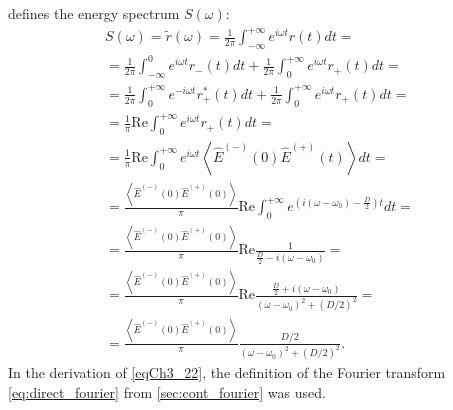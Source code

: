 defines the energy spectrum $S\left(\omega\right)$:  
\begin{eqnarray}
S\left(\omega\right) = \tilde{r}\left(\omega\right) = 
\frac{1}{2\pi}
\int_{-\infty}^{+\infty}e^{i \omega t} r\left(t\right) dt =
\nonumber \\
=
\frac{1}{2\pi}
\int_{-\infty}^0e^{i \omega t} r_{-}\left(t\right) dt +
\frac{1}{2\pi}
\int_0^{+\infty}e^{i \omega t} r_{+}\left(t\right) dt = 
\nonumber \\
=
\frac{1}{2\pi}
\int_0^{+\infty}e^{- i \omega t} r_{+}^{*}\left(t\right) dt +
\frac{1}{2\pi}
\int_0^{+\infty}e^{i \omega t} r_{+}\left(t\right) dt = 
\nonumber \\
=
\frac{1}{\pi} \mathrm{Re}
\int_0^{+\infty}e^{i \omega t} r_{+}\left(t\right) dt = 
\nonumber \\
= \frac{1}{\pi}\mathrm{Re}
\int_0^{+\infty}e^{i \omega t}
\left<\hat{E}^{(-)}\left(0\right)\hat{E}^{(+)}\left(t\right)\right> dt
=
\nonumber \\
= \frac{\left<\hat{E}^{(-)}\left(0\right)\hat{E}^{(+)}\left(0\right)\right>}{\pi} \mathrm{Re}
\int_0^{+\infty}e^{\left(i \left(\omega - \omega_0\right) - \frac{D}{2} \right) t} dt
=
\nonumber \\
=
\frac{\left<\hat{E}^{(-)}\left(0\right)\hat{E}^{(+)}\left(0\right)\right>}{\pi} \mathrm{Re}
\frac{1}{\frac{D}{2} - i \left(\omega - \omega_0\right)}
=
\nonumber \\
=
\frac{\left<\hat{E}^{(-)}\left(0\right)\hat{E}^{(+)}\left(0\right)\right>}{\pi} \mathrm{Re}
\frac{\frac{D}{2} + i \left(\omega - \omega_0\right)}
{\left(\omega - \omega_0\right)^2 + \left(D/2\right)^2}
=
\nonumber \\
=
\frac{\left<\hat{E}^{(-)}\left(0\right)\hat{E}^{(+)}\left(0\right)\right>}{\pi}
\frac{D/2}{\left(\omega - \omega_0\right)^2 + \left(D/2\right)^2}. 
\label{eqCh3_22}
\end{eqnarray}
In the derivation of \eqref{eqCh3_22}, the definition of the Fourier transform \eqref{eq:direct_fourier} from \autoref{sec:cont_fourier} was used.


